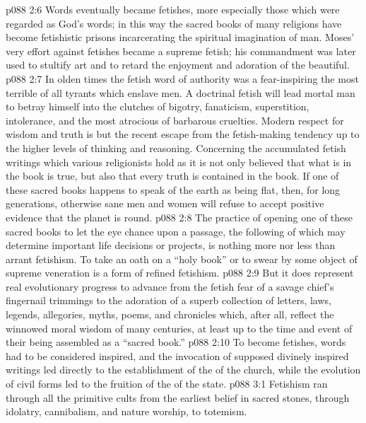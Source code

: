 \vs p088 2:6 \pc Words eventually became fetishes, more especially those which were regarded as God’s words; in this way the sacred books of many religions have become fetishistic prisons incarcerating the spiritual imagination of man. Moses’ very effort against fetishes became a supreme fetish; his commandment was later used to stultify art and to retard the enjoyment and adoration of the beautiful.
\vs p088 2:7 In olden times the fetish word of authority was a fear\hyp{}inspiring  the most terrible of all tyrants which enslave men. A doctrinal fetish will lead mortal man to betray himself into the clutches of bigotry, fanaticism, superstition, intolerance, and the most atrocious of barbarous cruelties. Modern respect for wisdom and truth is but the recent escape from the fetish\hyp{}making tendency up to the higher levels of thinking and reasoning. Concerning the accumulated fetish writings which various religionists hold as  it is not only believed that what is in the book is true, but also that every truth is contained in the book. If one of these sacred books happens to speak of the earth as being flat, then, for long generations, otherwise sane men and women will refuse to accept positive evidence that the planet is round.
\vs p088 2:8 The practice of opening one of these sacred books to let the eye chance upon a passage, the following of which may determine important life decisions or projects, is nothing more nor less than arrant fetishism. To take an oath on a “holy book” or to swear by some object of supreme veneration is a form of refined fetishism.
\vs p088 2:9 But it does represent real evolutionary progress to advance from the fetish fear of a savage chief’s fingernail trimmings to the adoration of a superb collection of letters, laws, legends, allegories, myths, poems, and chronicles which, after all, reflect the winnowed moral wisdom of many centuries, at least up to the time and event of their being assembled as a “sacred book.”
\vs p088 2:10 To become fetishes, words had to be considered inspired, and the invocation of supposed divinely inspired writings led directly to the establishment of the  of the church, while the evolution of civil forms led to the fruition of the  of the state.
\vs p088 3:1 Fetishism ran through all the primitive cults from the earliest belief in sacred stones, through idolatry, cannibalism, and nature worship, to totemism.
